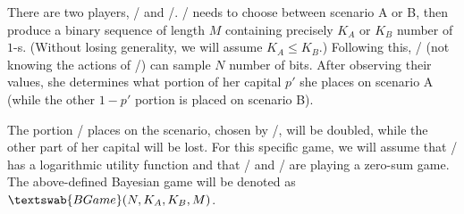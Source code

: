 \documentclass{beamer}
\theoremstyle{definition}
\newcommand{\BG}[1]{$\textswab{BGame}(#1)$}
\begin{document}
\begin{frame}{}

\begin{definition}

There are two players, \PI/ and \PII/.
\PII/ needs to choose between scenario A or B, then produce a binary sequence of length $M$ containing precisely $K_A$ or $K_B$ number of $1$-s. (Without losing generality, we will assume $K_A \le K_B$.)
Following this, \PI/ (not knowing the actions of \PII/) can sample $N$ number of bits. After observing their values, she determines what portion of her capital $p'$ she places on scenario A (while the other $1-p'$ portion is placed on scenario B).

The portion \PI/ places on the scenario, chosen by \PII/, will be doubled, while the other part of her capital will be lost.
For this specific game, we will assume that \PI/ has a logarithmic utility function and that \PI/ and \PII/ are playing a zero-sum game.
The above-defined Bayesian game will be denoted as 
\BG{N, K_A, K_B, M}.

\end{definition}


\end{frame}
\end{document}
